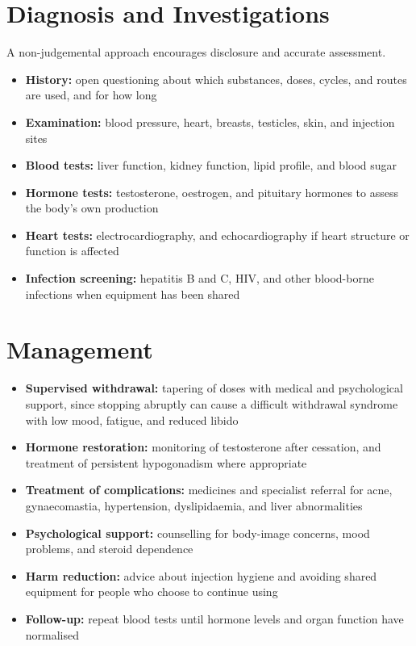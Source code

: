 \section*{Diagnosis and Investigations}
A non-judgemental approach encourages disclosure and accurate assessment.
\begin{itemize}
    \item \textbf{History:} open questioning about which substances, doses, cycles, and routes are used, and for how long
    \item \textbf{Examination:} blood pressure, heart, breasts, testicles, skin, and injection sites
    \item \textbf{Blood tests:} liver function, kidney function, lipid profile, and blood sugar
    \item \textbf{Hormone tests:} testosterone, oestrogen, and pituitary hormones to assess the body's own production
    \item \textbf{Heart tests:} electrocardiography, and echocardiography if heart structure or function is affected
    \item \textbf{Infection screening:} hepatitis B and C, HIV, and other blood-borne infections when equipment has been shared
\end{itemize}

\section*{Management}
\begin{itemize}
    \item \textbf{Supervised withdrawal:} tapering of doses with medical and psychological support, since stopping abruptly can cause a difficult withdrawal syndrome with low mood, fatigue, and reduced libido
    \item \textbf{Hormone restoration:} monitoring of testosterone after cessation, and treatment of persistent hypogonadism where appropriate
    \item \textbf{Treatment of complications:} medicines and specialist referral for acne, gynaecomastia, hypertension, dyslipidaemia, and liver abnormalities
    \item \textbf{Psychological support:} counselling for body-image concerns, mood problems, and steroid dependence
    \item \textbf{Harm reduction:} advice about injection hygiene and avoiding shared equipment for people who choose to continue using
    \item \textbf{Follow-up:} repeat blood tests until hormone levels and organ function have normalised
\end{itemize}

